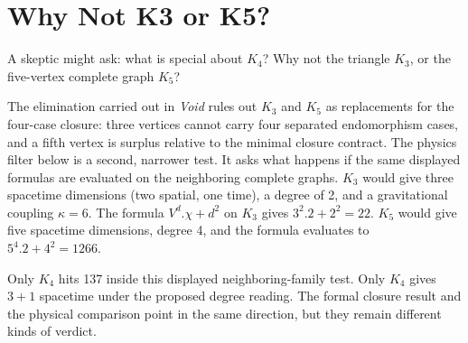\documentclass[11pt,a4paper]{book}
\def\cdot{.}%
\def\texorpdfstring#1#2{#2}%
\newcommand{\VoidRef}[2]{\textit{#2} (in \textit{Void})}
\begin{document}
\section{Why Not K\texorpdfstring{$_3$}{3} or K\texorpdfstring{$_5$}{5}?}

A skeptic might ask: what is special about $K_4$? Why not the triangle $K_3$, or the five-vertex complete graph $K_5$?

The elimination carried out in \textit{Void} rules out $K_3$ and $K_5$ as replacements for the four-case closure: three vertices cannot carry four separated endomorphism cases, and a fifth vertex is surplus relative to the minimal closure contract. The physics filter below is a second, narrower test. It asks what happens if the same displayed formulas are evaluated on the neighboring complete graphs. $K_3$ would give three spacetime dimensions (two spatial, one time), a degree of 2, and a gravitational coupling $\kappa = 6$. The formula $V^d \cdot \chi + d^2$ on $K_3$ gives $3^2 \cdot 2 + 2^2 = 22$. $K_5$ would give five spacetime dimensions, degree 4, and the formula evaluates to $5^4 \cdot 2 + 4^2 = 1266$.

Only $K_4$ hits 137 inside this displayed neighboring-family test. Only $K_4$ gives $3 + 1$ spacetime under the proposed degree reading. The formal closure result and the physical comparison point in the same direction, but they remain different kinds of verdict.%

\end{document}
